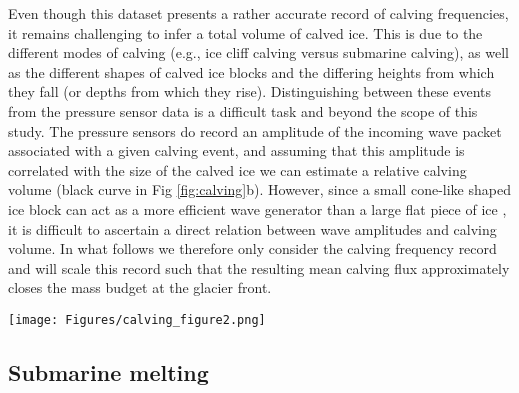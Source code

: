 \documentclass[10pt,letterpaper]{article}
\begin{document}
 Even though this dataset presents a rather accurate record of calving frequencies, it remains challenging to infer a total volume of calved ice. This is due to the different modes of calving (e.g., ice cliff calving versus submarine calving), as well as the different shapes of calved ice blocks and the differing heights from which they fall (or depths from which they rise). Distinguishing between these events from the pressure sensor data is a difficult task and beyond the scope of this study. The pressure sensors do record an amplitude of the incoming wave packet associated with a given calving event, and assuming that this amplitude is correlated with the size of the calved ice we can estimate a relative calving volume (black curve in Fig \ref{fig:calving}b). However, since a small cone-like shaped ice block can act as a more efficient wave generator than a large flat piece of ice \cite[N. Pizzo, personal communication,][]{BUHLER:2007db}, it is difficult to ascertain a direct relation between wave amplitudes and calving volume. In what follows we therefore only consider the calving frequency record and will scale this record such that the resulting mean calving flux approximately closes the mass budget at the glacier front.
 
   \begin{figure*}[h]
 \begin{center}
  \texttt{[image: Figures/calving\_figure2.png]}
  \caption{(a) Close-up of glacier front and adjacent fjord, with the red rectangle outlining the region of interest (next panel) and red stars indicating the location of the wave moorings (see text); (b) spatial calving distribution as estimated from pressure sensor data; the shaded rectangle indicates the promontory at the western part of the glacier front (see text);  (c) calving count along glacier front, obtained as total number of calving events detected within a 300 m running window along the glacier front (with bins centered on the bars); the promontory is again indicated by the shaded gray area. Also shown is an estimate for the relative calving volume, computed from the product of the frequency of calving events at a location $x$, and the corresponding magnitudes of the detected waves (right axes, black line).}
  \label{fig:calving}
  \end{center}
\end{figure*}


\subsection{Submarine melting} \label{melting}
\end{document}
